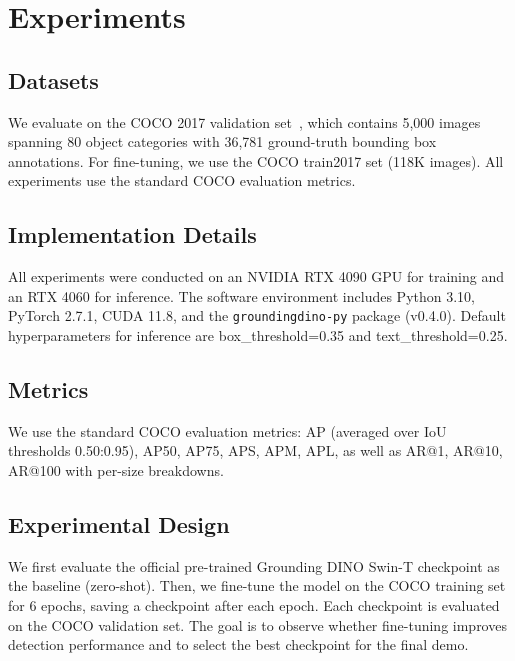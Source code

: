 \documentclass[10pt,journal,final,twocolumn]{IEEEtran}
\begin{document}
\section{Experiments}

\subsection{Datasets}

We evaluate on the COCO 2017 validation set~\cite{Lin14}, which contains 5,000 images spanning 80 object categories with 36,781 ground-truth bounding box annotations. For fine-tuning, we use the COCO train2017 set (118K images). All experiments use the standard COCO evaluation metrics.

\subsection{Implementation Details}

All experiments were conducted on an NVIDIA RTX 4090 GPU for training and an RTX 4060 for inference. The software environment includes Python 3.10, PyTorch 2.7.1, CUDA 11.8, and the \texttt{groundingdino-py} package (v0.4.0). Default hyperparameters for inference are box\_threshold=0.35 and text\_threshold=0.25.

\subsection{Metrics}

We use the standard COCO evaluation metrics: AP (averaged over IoU thresholds 0.50:0.95), AP50, AP75, APS, APM, APL, as well as AR@1, AR@10, AR@100 with per-size breakdowns.

\subsection{Experimental Design}

We first evaluate the official pre-trained Grounding DINO Swin-T checkpoint as the baseline (zero-shot). Then, we fine-tune the model on the COCO training set for 6 epochs, saving a checkpoint after each epoch. Each checkpoint is evaluated on the COCO validation set. The goal is to observe whether fine-tuning improves detection performance and to select the best checkpoint for the final demo.
\end{document}
